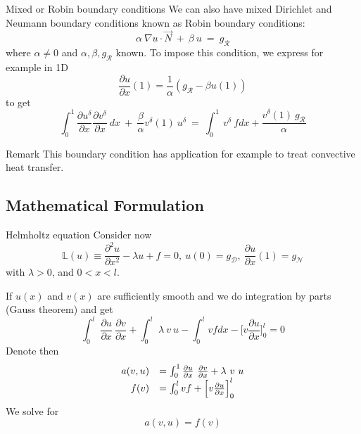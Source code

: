 \begin{frame}{Mixed or Robin boundary conditions}
  We can also have mixed Dirichlet and Neumann boundary conditions known as Robin boundary conditions:
  \begin{equation}
    \label{eq:17}
    \alpha\ \nabla u \cdot \overrightarrow{N }\ +\ \beta\ u\ =\ g_{\mathcal{R}}
  \end{equation}
  where $\alpha \neq 0$ and $\alpha, \beta, g_{\mathcal{R}}$ known.
  To impose this condition, we express for example in 1D
  \begin{equation}
    \label{eq:18}
    \frac{\partial u}{\partial x}(1) = \frac{1}{\alpha}( g_{\mathcal{R}} - \beta u(1) )
  \end{equation}
  to get
  \begin{equation}
    \label{eq:19}
    \int_0^1 \frac{\partial u^{\delta}}{\partial x}\frac{\partial v^{\delta}}{\partial x}\ dx\ +\ \frac{\beta}{\alpha} v^{\delta}(1)\ u^{\delta}\ =\  \int_0^1\ v^{\delta}\ f dx + \frac{v^{\delta}(1)\ g_{\mathcal{R}}}{\alpha}
  \end{equation}

  \begin{block}{Remark}
    This boundary condition has application for example to treat
    convective heat transfer.
  \end{block}
\end{frame}

\subsection{Mathematical Formulation}
\label{sec:math-form}

\begin{frame}{Helmholtz equation}
  Consider now
  \begin{equation}
    \label{eq:15}
    \mathbb{L}(u) \equiv \frac{\partial^2 u}{\partial x^2} - \lambda u + f = 0,\ u(0) = g_{\mathcal{D}},\ \frac{\partial u}{\partial x}(1) = g_{\mathcal{N}}
  \end{equation}
  with $\lambda > 0$, and $0 < x < l$.

  If $u(x)$ and $v(x)$ are sufficiently smooth and we do integration by parts (Gauss theorem) and get
  \begin{equation}
    \label{eq:20}
    \int_0^l\ \frac{\partial u}{\partial x}\ \frac{\partial v}{\partial x} + \int_0^l\ \lambda\ v\ u - \int_0^l v f dx - \Big[ v\frac{\partial u}{\partial x}\Big]_0^l = 0
  \end{equation}
  Denote then
  \begin{equation}
    \label{eq:21}
    \begin{array}[c]{rl}
      a(v, u) &= \int_0^1 \frac{\partial u}{\partial x}\ \frac{\partial v}{\partial x} + \lambda\ v\ u\\
      f(v) &= \int_0^l vf + \Big[ v\frac{\partial u}{\partial x}\Big]_0^l
    \end{array}
  \end{equation}
  We solve for
  \begin{equation}
    \label{eq:22}
    a(v,u) = f(v)
  \end{equation}
\end{frame}

